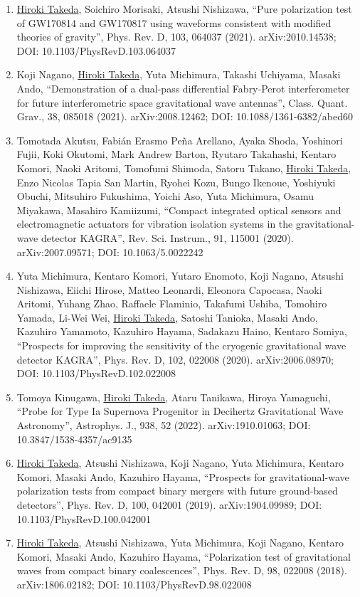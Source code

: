 \documentclass[uplatex, 12pt]{article}
\begin{document}
\begin{enumerate}
\item \uline{Hiroki Takeda}, Soichiro Morisaki, Atsushi Nishizawa, “Pure polarization test of GW170814 and GW170817 using waveforms consistent with modified theories of gravity”, Phys. Rev. D, 103, 064037 (2021). arXiv:2010.14538; DOI: 10.1103/PhysRevD.103.064037
\item Koji Nagano, \uline{Hiroki Takeda}, Yuta Michimura, Takashi Uchiyama, Masaki Ando, “Demonstration of a dual-pass differential Fabry-Perot interferometer for future interferometric space gravitational wave antennas”, Class. Quant. Grav., 38, 085018 (2021). arXiv:2008.12462; DOI: 10.1088/1361-6382/abed60
\item Tomotada Akutsu, Fabián Erasmo Peña Arellano, Ayaka Shoda, Yoshinori Fujii, Koki Okutomi, Mark Andrew Barton, Ryutaro Takahashi, Kentaro Komori, Naoki Aritomi, Tomofumi Shimoda, Satoru Takano, \uline{Hiroki Takeda}, Enzo Nicolas Tapia San Martin, Ryohei Kozu, Bungo Ikenoue, Yoshiyuki Obuchi, Mitsuhiro Fukushima, Yoichi Aso, Yuta Michimura, Osamu Miyakawa, Masahiro Kamiizumi, “Compact integrated optical sensors and electromagnetic actuators for vibration isolation systems in the gravitational-wave detector KAGRA”, Rev. Sci. Instrum., 91, 115001 (2020). arXiv:2007.09571; DOI: 10.1063/5.0022242
\item Yuta Michimura, Kentaro Komori, Yutaro Enomoto, Koji Nagano, Atsushi Nishizawa, Eiichi Hirose, Matteo Leonardi, Eleonora Capocasa, Naoki Aritomi, Yuhang Zhao, Raffaele Flaminio, Takafumi Ushiba, Tomohiro Yamada, Li-Wei Wei, \uline{Hiroki Takeda}, Satoshi Tanioka, Masaki Ando, Kazuhiro Yamamoto, Kazuhiro Hayama, Sadakazu Haino, Kentaro Somiya, “Prospects for improving the sensitivity of the cryogenic gravitational wave detector KAGRA”, Phys. Rev. D, 102, 022008 (2020). arXiv:2006.08970; DOI: 10.1103/PhysRevD.102.022008
\item Tomoya Kinugawa, \uline{Hiroki Takeda}, Ataru Tanikawa, Hiroya Yamaguchi, “Probe for Type Ia Supernova Progenitor in Decihertz Gravitational Wave Astronomy”, Astrophys. J., 938, 52 (2022). arXiv:1910.01063; DOI: 10.3847/1538-4357/ac9135
\item \uline{Hiroki Takeda}, Atsushi Nishizawa, Koji Nagano, Yuta Michimura, Kentaro Komori, Masaki Ando, Kazuhiro Hayama, “Prospects for gravitational-wave polarization tests from compact binary mergers with future ground-based detectors”, Phys. Rev. D, 100, 042001 (2019). arXiv:1904.09989; DOI: 10.1103/PhysRevD.100.042001
\item \uline{Hiroki Takeda}, Atsushi Nishizawa, Yuta Michimura, Koji Nagano, Kentaro Komori, Masaki Ando, Kazuhiro Hayama, “Polarization test of gravitational waves from compact binary coalescences”, Phys. Rev. D, 98, 022008 (2018). arXiv:1806.02182; DOI: 10.1103/PhysRevD.98.022008

\end{enumerate}
\end{document}

